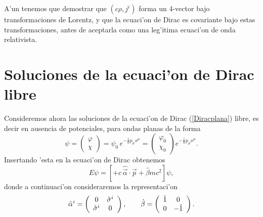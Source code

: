 A'un tenemos que demostrar que $\left( c\rho ,j^i\right) $ forma un
4-vector bajo transformaciones de Lorentz, y que la ecuaci'on de Dirac es
covariante bajo estas transformaciones, antes de aceptarla como una
leg'itima ecuaci'on de onda relativista.

\section{Soluciones de la ecuaci'on de Dirac libre}

Consideremos ahora las soluciones de la ecuaci'on de Dirac (\ref{Diracplana})
libre, es decir en ausencia de potenciales, para ondas planas de la forma
\begin{equation}
\psi=\left( \begin{array}{c}\varphi \\ \chi\end{array}\right)=\psi_0\,
e^{-\frac{i}{\hbar}p_\mu x^\mu}=\left( \begin{array}{c}\varphi_0 \\
\chi_0\end{array}\right) e^{-\frac{i}{\hbar}p_\mu x^\mu}.
\end{equation} 
Insertando 'esta en la ecuaci'on de Dirac obtenemos
\begin{equation}\label{Diracplana2}
E\psi=\left[ +c\,\hat{\vec{\alpha}}\cdot\vec{p}+\hat{\beta}mc^2\right] \psi ,
\end{equation}
donde a continuaci'on consideraremos la representaci'on
\begin{equation}
\hat{\alpha}^i=\left(
\begin{array}[c]{cc} 0 & \hat{\sigma}^i\\
\hat{\sigma}^i & 0
\end{array}\right), \qquad 
\hat{\beta}=\left(
\begin{array}
[c]{cc}%
\hat{1} & 0\\
0 & -\hat{1}
\end{array}
\right) .
\end{equation} 


